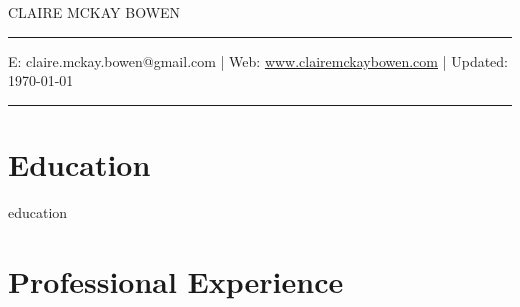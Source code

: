 \documentclass[11pt, letterpaper, roman]{moderncv} %
\begin{document}
\vspace{-10pt}
\centerline{\huge{CLAIRE MCKAY BOWEN}}
\vspace{10pt}
\hrule
\vspace{5pt}
\centerline{\small E: claire.mckay.bowen@gmail.com | Web: \href{https://www.clairemckaybowen.com}{www.clairemckaybowen.com} | Updated: \today}
\vspace{5pt}
\hrule


\section{Education}
{education}

\section{Professional Experience}
\end{document}
